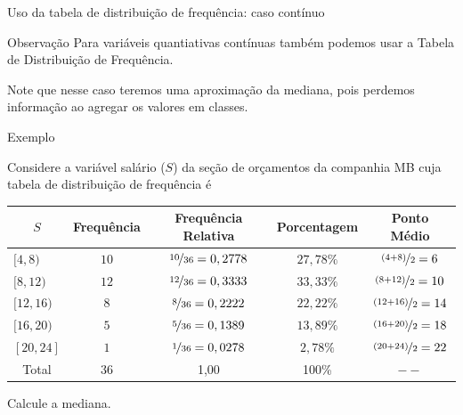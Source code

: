 \documentclass[8pt]{beamer}
\begin{document}
\begin{frame}{Uso da tabela de distribuição de frequência: caso contínuo}


\begin{block}{Observação}
  Para variáveis quantiativas contínuas também podemos usar a Tabela de Distribuição de Frequência. 
  
  Note que nesse caso teremos uma {\color{red} aproximação} da mediana, pois perdemos informação ao agregar os valores 
  em classes.
 \end{block}

 \begin{block}{Exemplo}
 
 Considere a variável salário ($S$) da seção de orçamentos da companhia MB cuja tabela de distribuição de frequência é 
   \begin{table}
   \centering
   \begin{tabular}{l|ccc|c}
    \toprule[0.05cm]
    \multicolumn{1}{c|}{$S$} & Frequência & Frequência Relativa & Porcentagem & Ponto Médio \\ \midrule[0.05cm]
    $[4, 8)$ & $10$ & $\nicefrac{10}{36}=0,2778$ & $27,78 \%$ & $\nicefrac{(4+8)}{2} = 6$ \\
    $[8, 12)$ & $12$ & $\nicefrac{12}{36}=0,3333$ & $33,33 \%$ & $\nicefrac{(8+12)}{2} = 10$\\
    $[12, 16)$ & $8$ & $\nicefrac{8}{36}=0,2222$ & $22,22 \%$ &  $\nicefrac{(12+16)}{2} = 14$\\
    $[16, 20)$ & $5$ & $\nicefrac{5}{36}=0,1389$ & $13,89 \%$ & $\nicefrac{(16+20)}{2} = 18$\\
    $[20, 24]$ & $1$ & $\nicefrac{1}{36}=0,0278$ & $2,78 \%$ & $\nicefrac{(20+24)}{2} =22$\\ \midrule[0.05cm]
    \multicolumn{1}{c|}{Total} & 36 & 1,00 & 100\% & $--$ \\ \bottomrule[0.05cm]
   \end{tabular}
  \end{table}
  Calcule a mediana. 
  \end{block}
\end{frame}
\end{document}
